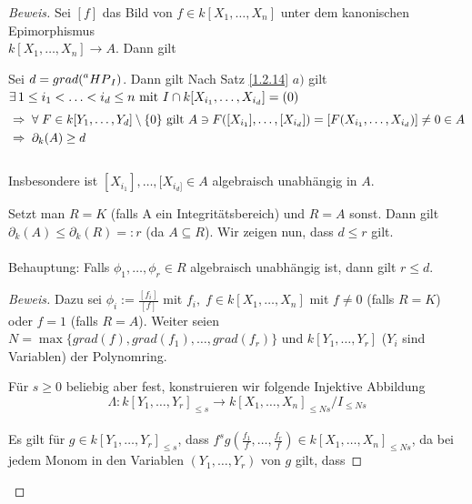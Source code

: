 \documentclass{article}
\newcommand*{\R}{k[X_{1},\ldots,X_{n}]}
\newcommand*{\indx}[2]{{#1}_{#2}}
\newcommand*{\potx}[2]{{#1}^{#2}}
\newcommand*{\hp}[1]{$\prescript{a}{}{HP}_{#1}$}
\begin{document}
\begin{proof}[Beweis]
	Sei $[f]$ das Bild von $f\in \R$ unter dem kanonischen Epimorphismus \\$\R\rightarrow A$. Dann gilt
	\begin{compactenum}
		\item Sei $d=grad(\textnormal{\hp{I}})$. Dann gilt Nach Satz \ref{1.2.14} $a)$ gilt $\exists{\,} 1\leq\indx{i}{1}<\ldots<\indx{i}{d}\leq n \textnormal{ mit } I\cap k[\indx{X}{\indx{i}{1}},\ldots,\indx{X}{\indx{i}{d}}]=(0)$
		\begin{align*}
		&\Rightarrow \; \forall \;F\in k[\indx{Y}{1},\ldots,\indx{Y}{d}]\setminus\{0\} \textnormal{ gilt } A\ni F([\indx{X}{\indx{i}{1}}],\ldots,[\indx{X}{\indx{i}{d}}])=[F(\indx{X}{\indx{i}{1}},\ldots,\indx{X}{\indx{i}{d}})]\neq0 \in A\\&
		\Rightarrow \; \indx{\partial}{k}(A)\geq d
		\end{align*}
		\\
		Insbesondere ist $[\indx{X}{\indx{i}{1}}],\ldots,[\indx{X}{\indx{i}{d}]}\in A$ algebraisch unabhängig in $A$.\\
		\item Setzt man $R=K$ (falls A ein Integritätsbereich) und $R=A$ sonst. Dann gilt $\indx{\partial}{k}(A)\leq \indx{\partial}{k}(R)=:r$ (da $A\subseteq R$). Wir zeigen nun, dass $d\leq r$ gilt. 
		\\\\
		Behauptung: Falls $\indx{\phi}{1},\ldots,\indx{\phi}{r}\in R$ algebraisch unabhängig ist, dann gilt $r\leq d$.\\
		\begin{proof}[Beweis]
			Dazu sei $\indx{\phi}{i}:=\frac{[\indx{f}{i}]}{[f]}$ mit $\indx{f}{i},\;f\in \R$ mit $f\neq0$ (falls $R=K$) oder $f=1$ (falls $R=A$). Weiter seien $N=\max{\{grad(f),grad(\indx{f}{1}),\ldots,grad(\indx{f}{r})\}}$ und  $k[\indx{Y}{1},\ldots,\indx{Y}{r}]$ ($\indx{Y}{i}$ sind Variablen) der Polynomring.
			
			Für $s\geq0$ beliebig aber fest, konstruieren wir folgende Injektive Abbildung
			\begin{displaymath}
			\Lambda :\indx{k[\indx{Y}{1},\ldots,\indx{Y}{r}]}{\leq s}\rightarrow\indx{\R}{\leq Ns}/\indx{I}{\leq Ns}
			\end{displaymath}
			\\
			Es gilt für $g\in \indx{k[\indx{Y}{1},\ldots,\indx{Y}{r}]}{\leq s}$, dass $\potx{f}{s}g(\frac{\indx{f}{1}}{f},\ldots,\frac{\indx{f}{r}}{f})\in \indx{\R}{\leq Ns}$, da  bei jedem Monom in den Variablen $(\indx{Y}{1},\ldots,\indx{Y}{r})$ von $g$ gilt, dass
			

\end{proof}
\end{compactenum}
\end{proof}
\end{document}
